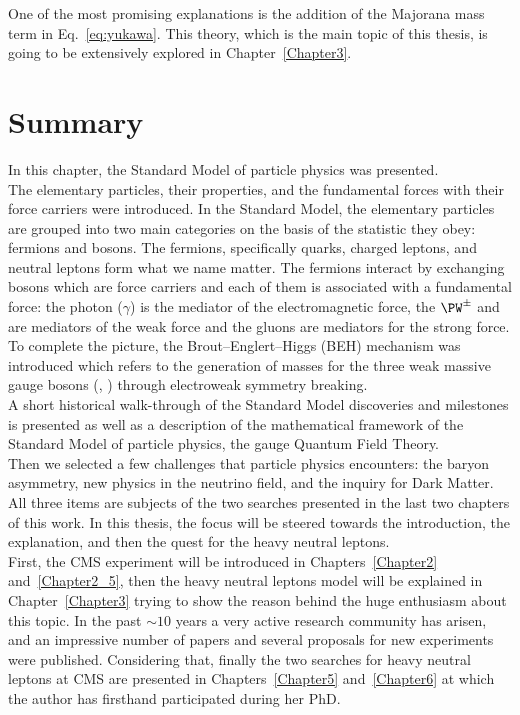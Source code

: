 One of the most promising explanations is the addition of the Majorana mass term in Eq.~\ref{eq:yukawa}. This theory, which is the main topic of this thesis, is going to be extensively explored in Chapter~\ref{Chapter3}.
\clearpage
\section{Summary}\label{sec:summaryC1}
In this chapter, the Standard Model of particle physics was presented.\\
The elementary particles, 
their properties, and the fundamental forces with their force carriers were introduced. 
In the Standard Model, the elementary particles are grouped into two main categories on the basis of the statistic they obey: fermions and bosons. The fermions, specifically quarks, charged leptons, and neutral leptons form what we name matter. The fermions interact by exchanging bosons which are force carriers and each of them is associated with a fundamental force: the photon ($\gamma$) is the mediator of the electromagnetic force, the $\PW^{\pm}$ and \PZ are mediators of the weak force and the gluons are mediators for the strong force.
To complete the picture, the Brout–Englert–Higgs (BEH) mechanism was introduced which refers to the generation of masses for the three weak massive gauge bosons (\PW, \PZ) through electroweak symmetry breaking.\\
A short historical walk-through of the Standard Model discoveries and milestones is presented as well as a description of the mathematical framework of the Standard Model of particle physics, the gauge Quantum Field Theory.\\
Then we selected a few challenges that particle
physics encounters: the baryon asymmetry, new physics in the neutrino field, and
the inquiry for Dark Matter. All three items are subjects of the two searches presented in the last two chapters of this work. In this thesis, the focus will be steered towards the introduction, the explanation, and then the quest for the heavy neutral leptons. \\
First, the CMS experiment will be introduced in Chapters~\ref{Chapter2} and~\ref{Chapter2_5}, then the heavy neutral leptons model will be explained in Chapter~\ref{Chapter3} trying to show the reason behind the huge enthusiasm about this topic. In the past $\sim10$ years a very active research community has arisen, and an impressive number of papers and several proposals for new experiments were published. Considering that, finally the two searches for heavy neutral leptons at CMS are presented in Chapters~\ref{Chapter5} and~\ref{Chapter6} at which the author has firsthand participated during her PhD.



